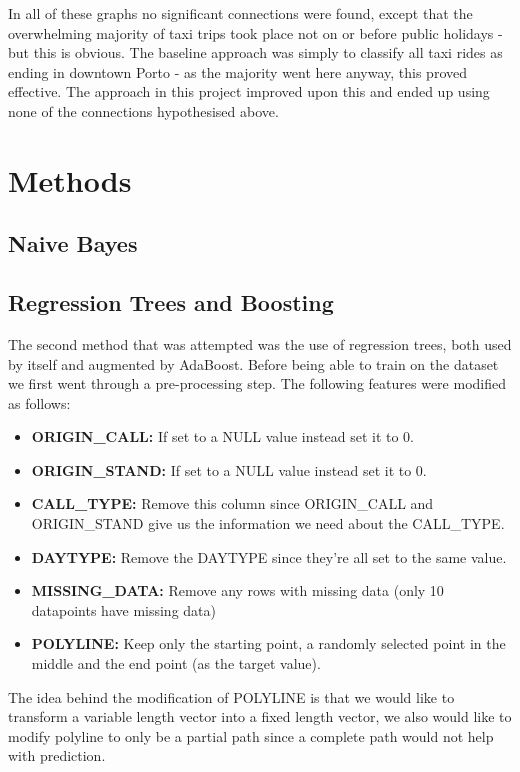 \documentclass[12pt]{article}
\begin{document}
In all of these graphs no significant connections were found, except that the overwhelming majority of taxi trips took place not on or before public holidays - but this is obvious. 
The baseline approach was simply to classify all taxi rides as ending in downtown Porto - as the majority went here anyway, this proved effective. 
The approach in this project improved upon this and ended up using none of the connections hypothesised above. 

\section{Methods}
\subsection{Naive Bayes}


\subsection{Regression Trees and Boosting}
The second method that was attempted was the use of regression trees, both used by itself and augmented by AdaBoost. Before being able to train on the dataset we first went through a pre-processing step. The following features were modified as follows:
\begin{itemize}
  \item \textbf{ORIGIN\_CALL:} If set to a NULL value instead set it to 0.
  \item \textbf{ORIGIN\_STAND:} If set to a NULL value instead set it to 0.
  \item \textbf{CALL\_TYPE:} Remove this column since ORIGIN\_CALL and ORIGIN\_STAND give us the information we need about the CALL\_TYPE.
  \item \textbf{DAYTYPE:} Remove the DAYTYPE since they're all set to the same value.
  \item \textbf{MISSING\_DATA:} Remove any rows with missing data (only 10 datapoints have missing data)
  \item \textbf{POLYLINE:} Keep only the starting point, a randomly selected point in the middle and the end point (as the target value).
\end{itemize}
The idea behind the modification of POLYLINE is that we would like to transform a variable length vector into a fixed length vector, we also would like to modify polyline to only be a partial path since a complete path would not help with prediction.
\end{document}

